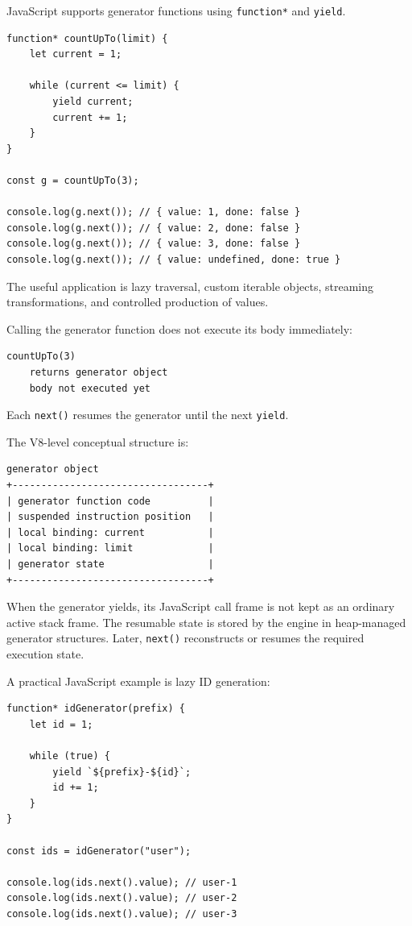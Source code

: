 JavaScript supports generator functions using \texttt{function*} and \texttt{yield}.

\begin{verbatim}
function* countUpTo(limit) {
    let current = 1;

    while (current <= limit) {
        yield current;
        current += 1;
    }
}

const g = countUpTo(3);

console.log(g.next()); // { value: 1, done: false }
console.log(g.next()); // { value: 2, done: false }
console.log(g.next()); // { value: 3, done: false }
console.log(g.next()); // { value: undefined, done: true }
\end{verbatim}

The useful application is lazy traversal, custom iterable objects, streaming transformations, and controlled production of values.

Calling the generator function does not execute its body immediately:

\begin{verbatim}
countUpTo(3)
    returns generator object
    body not executed yet
\end{verbatim}

Each \texttt{next()} resumes the generator until the next \texttt{yield}.

The V8-level conceptual structure is:

\begin{verbatim}
generator object
+----------------------------------+
| generator function code          |
| suspended instruction position   |
| local binding: current           |
| local binding: limit             |
| generator state                  |
+----------------------------------+
\end{verbatim}

When the generator yields, its JavaScript call frame is not kept as an ordinary active stack frame. The resumable state is stored by the engine in heap-managed generator structures. Later, \texttt{next()} reconstructs or resumes the required execution state.

A practical JavaScript example is lazy ID generation:

\begin{verbatim}
function* idGenerator(prefix) {
    let id = 1;

    while (true) {
        yield `${prefix}-${id}`;
        id += 1;
    }
}

const ids = idGenerator("user");

console.log(ids.next().value); // user-1
console.log(ids.next().value); // user-2
console.log(ids.next().value); // user-3
\end{verbatim}


